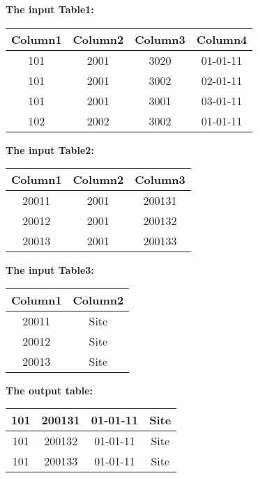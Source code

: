\begin{figure}[t]
\centering
\textbf{The input Table1:}

\begin{tabular}{|c|c|c|c|}
\hline
 Column1 & Column2& Column3& Column4\\
 \hline
 101 &  2001 &  3020 &  01-01-11\\
\hline
 101 &  2001 &  3002 &  02-01-11\\
\hline
 101 &  2001 &  3001 &  03-01-11\\
\hline
 102 &  2002 &  3002 &  01-01-11\\
\hline
\end{tabular}

\vspace{2mm}

\textbf{The input Table2:}

\begin{tabular}{|c|c|c|}
\hline
 Column1 & Column2& Column3 \\
 \hline
 20011 &  2001 &  200131\\
\hline
 20012 &  2001 &  200132\\
\hline
 20013 &  2001 &  200133\\
\hline
\end{tabular}

\vspace{2mm}

\textbf{The input Table3:}

\begin{tabular}{|c|c|}
\hline
 Column1 & Column2\\
 \hline
 20011 &  Site\\
\hline
 20012 &  Site\\
\hline
 20013 &  Site\\
\hline
\end{tabular}

\vspace{3mm}

\textbf{The output table:}

\begin{tabular}{|c|c|c|c|}
\hline
 101 & 200131 & 01-01-11 & Site\\
 \hline
 101 & 200132 & 01-01-11 & Site\\
 \hline
 101 & 200133 & 01-01-11 & Site\\
 \hline
\end{tabular}
 \vspace{2mm}
\end{figure}

